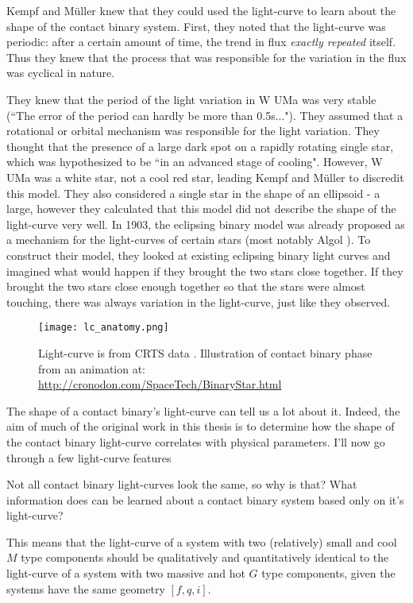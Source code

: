 \documentclass[12pt]{article} %
\numberwithin{equation}{section} %
\begin{document}
Kempf and M\"{u}ller knew that they could used the light-curve to learn about the shape of the contact binary system. First, they noted that the light-curve was periodic: after a certain amount of time, the trend in flux \emph{exactly repeated} itself. Thus they knew that the process that was responsible for the variation in the flux was cyclical in nature. 

They knew that the period of the light variation in W UMa was very stable (``The error of the period can hardly be more than 0.5s..."). They assumed that a rotational or orbital mechanism was responsible for the light variation. They thought that the presence of a large dark spot on a rapidly rotating single star, which was hypothesized to be ``in an advanced stage of cooling". However, W UMa was a white star, not a cool red star, leading Kempf and M\"{u}ller to discredit this model. They also considered a single star in the shape of an ellipsoid - a large, however they calculated that this model did not describe the shape of the light-curve very well. In 1903, the eclipsing binary model was already proposed as a mechanism for the light-curves of certain stars (most notably Algol ). To construct their model, they looked at existing eclipsing binary light curves and imagined what would happen if they brought the two stars close together. If they brought the two stars close enough together so that the stars were almost touching, there was always variation in the light-curve, just like they observed.

\begin{figure}[H]
\centering
\texttt{[image: lc\_anatomy.png]}
\caption{Light-curve is from CRTS data \citep{drake2014catalina}. Illustration of contact binary phase from an animation at: \url{http://cronodon.com/SpaceTech/BinaryStar.html}}
\label{fig: lc_anatomy}
\end{figure}

The shape of a contact binary's light-curve can tell us a lot about it. Indeed, the aim of much of the original work in this thesis is to determine how the shape of the contact binary light-curve correlates with physical parameters. I'll now go through a few light-curve features 

Not all contact binary light-curves look the same, so why is that? What information does can be learned about a contact binary system based only on it's light-curve?

This means that the light-curve of a system with two (relatively) small and cool $M$ type components should be qualitatively and quantitatively identical to the light-curve of a system with two massive and hot $G$ type components, given the systems have the same geometry $[f,q,i]$.
\end{document}
